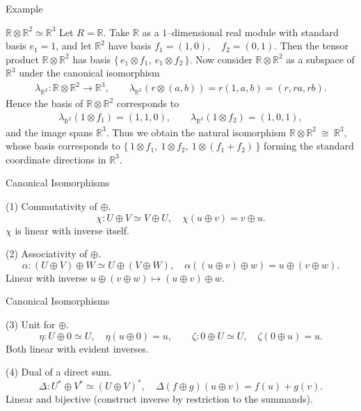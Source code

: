 \begin{frame}{Example}
\vspace{-0.3cm}
\begin{block}{$\mathbb{R}\otimes \mathbb{R}^2 \simeq \mathbb{R}^3$}
Let $R=\mathbb{R}$.
Take $\mathbb{R}$ as a $1$–dimensional real module with standard basis $e_1=1$, and let $\mathbb{R}^2$ have basis $f_1=(1,0), \quad f_2=(0,1).$
Then the tensor product $\mathbb{R}\otimes \mathbb{R}^2$ has basis $\{\, e_1\otimes f_1,\ e_1\otimes f_2 \,\}.$ Now consider $\mathbb{R}\otimes \mathbb{R}^2$ as a subspace of $\mathbb{R}^3$ under the canonical isomorphism
\vspace{-0.3cm}
\begin{align*}
\lambda_{\mathbb{R}^2}:\mathbb{R}\otimes \mathbb{R}^2 \longrightarrow \mathbb{R}^3, \qquad
\lambda_{\mathbb{R}^2}(r\otimes (a,b)) = r(1,a,b) = (r, ra, rb).
\end{align*}
Hence the basis of $\mathbb{R}\otimes \mathbb{R}^2$ corresponds to
\vspace{-0.3cm}
\begin{align*}
\lambda_{\mathbb{R}^2}(1\otimes f_1)=(1,1,0), \qquad
\lambda_{\mathbb{R}^2}(1\otimes f_2)=(1,0,1),
\end{align*}
and the image spans $\mathbb{R}^3$. Thus we obtain the natural isomorphism $\mathbb{R}\otimes \mathbb{R}^2 \ \cong\ \mathbb{R}^3,$ whose basis corresponds to $\{\,1\otimes f_1,\ 1\otimes f_2,\ 1\otimes (f_1+f_2)\,\}$ forming the standard coordinate directions in $\mathbb{R}^3$.
\end{block}
\end{frame}

\begin{frame}{Canonical Isomorphisms}
\begin{block}{(1) Commutativity of $\oplus$.}
\[
\chi:U\oplus V\simeq V\oplus U,\quad \chi(u\oplus v)=v\oplus u.
\]
$\chi$ is linear with inverse itself.
\end{block}

\begin{block}{(2) Associativity of $\oplus$.}
\[
\alpha:(U\oplus V)\oplus W \simeq U\oplus (V\oplus W),\quad \alpha((u\oplus v)\oplus w)=u\oplus (v\oplus w).
\]
Linear with inverse $u\oplus (v\oplus w)\mapsto (u\oplus v)\oplus w$.
\end{block}
\end{frame}

\begin{frame}{Canonical Isomorphisms}
\begin{block}{(3) Unit for $\oplus$.}
\[
\eta: U\oplus 0 \simeq U,\quad \eta(u\oplus 0)=u,\qquad
\zeta: 0\oplus U \simeq U,\quad \zeta(0\oplus u)=u.
\]
Both linear with evident inverses.

\end{block}

\begin{block}{(4) Dual of a direct sum.}
\[
\Delta: U^*\oplus V^* \simeq (U\oplus V)^*,\quad
\Delta(f\oplus g)(u\oplus v)= f(u)+g(v).
\]
Linear and bijective (construct inverse by restriction to the summands).

\end{block}
\end{frame}

